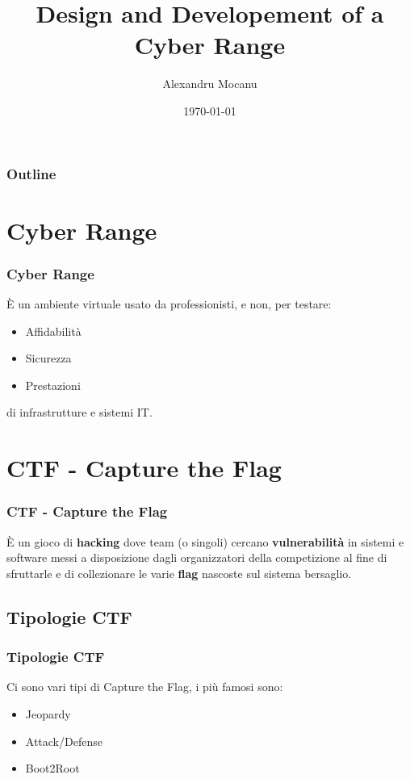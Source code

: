 \documentclass{beamer}
\title[Cyber Range]{Design and Developement of a Cyber Range}
\author[A. Mocanu]{Alexandru Mocanu}
\institute[UniTo]{Università Degli Studi di Torino\\ Dipartimento di Informatica}
\date{\today}
\begin{document}
\lstset{style=code}


\begin{frame}
    \titlepage
\end{frame}

\begin{frame}
    \frametitle{Outline}

    \tableofcontents

\end{frame}

\section{Cyber Range}
\begin{frame}
    \frametitle{Cyber Range}

    È un ambiente virtuale usato da professionisti, e non, per testare:
    \begin{itemize}
        \item Affidabilità
        \item Sicurezza
        \item Prestazioni
    \end{itemize}
    di infrastrutture e sistemi IT.
\end{frame}

\section{CTF - Capture the Flag}
\begin{frame}
    \frametitle{CTF - Capture the Flag}

    È un gioco di \textbf{hacking} dove team (o singoli) cercano \textbf{vulnerabilità} in sistemi
    e software messi a disposizione dagli organizzatori della competizione al fine di sfruttarle e 
    di collezionare le varie \textbf{flag} nascoste sul sistema bersaglio.
    

\end{frame}
\subsection{Tipologie CTF}
\begin{frame}
    \frametitle{Tipologie CTF}
    Ci sono vari tipi di Capture the Flag, i più famosi sono:
    \begin{itemize}
        \item Jeopardy
        \item Attack/Defense
        \item Boot2Root
    \end{itemize}
    

\end{frame}
\end{document}
